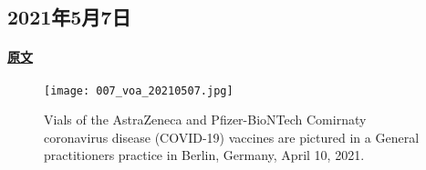 \subsection{2021年5月7日}
\paragraph{\href{https://www.51voa.com/VOA_Special_English/more-support-easing-vaccine-patent-rules-but-problems-remain-more-support-easing-vaccine-patent-rules-but-problems-remain-86814.html}{原文}}

\begin{figure}[H]
\centering
\texttt{[image: 007\_voa\_20210507.jpg]}
\caption{Vials of the AstraZeneca and Pfizer-BioNTech Comirnaty coronavirus disease (COVID-19) vaccines are pictured in a General practitioners practice in Berlin, Germany, April 10, 2021.}
\end{figure}

